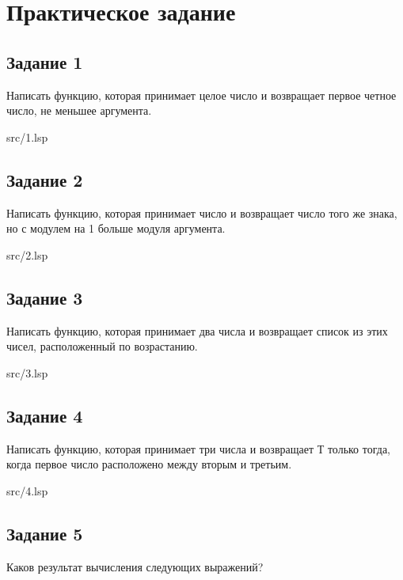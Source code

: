 \chapter*{Практическое задание}

\section*{Задание 1}
Написать функцию, которая принимает целое число и возвращает первое
четное число, не меньшее аргумента.

\FloatBarrier
\begin{lstinputlisting}[style={lsp}]{src/1.lsp}
\end{lstinputlisting}
\FloatBarrier

\section*{Задание 2}
Написать функцию, которая принимает число и возвращает число
того же знака, но с модулем на 1 больше модуля аргумента.

\FloatBarrier
\begin{lstinputlisting}[style={lsp}]{src/2.lsp}
\end{lstinputlisting}
\FloatBarrier

\section*{Задание 3}
Написать функцию, которая принимает два числа и возвращает
список из этих чисел, расположенный по возрастанию.

\FloatBarrier
\begin{lstinputlisting}[style={lsp}]{src/3.lsp}
\end{lstinputlisting}
\FloatBarrier

\clearpage

\section*{Задание 4}
Написать функцию, которая принимает три числа и возвращает Т только
тогда, когда первое число расположено между вторым и третьим.

\FloatBarrier
\begin{lstinputlisting}[style={lsp}]{src/4.lsp}
\end{lstinputlisting}
\FloatBarrier

\section*{Задание 5}
Каков результат вычисления следующих выражений?

